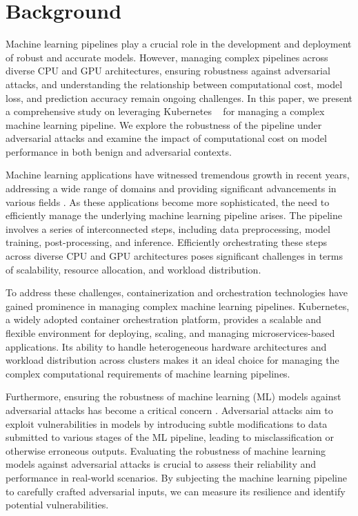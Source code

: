 \documentclass[conference]{IEEEtran}
\begin{document}
\section{Background}
Machine learning pipelines play a crucial role in the development and deployment of robust and accurate models. However, managing complex pipelines across diverse CPU and GPU architectures, ensuring robustness against adversarial attacks, and understanding the relationship between computational cost, model loss, and prediction accuracy remain ongoing challenges. In this paper, we present a comprehensive study on leveraging Kubernetes ~\cite{k8s} for managing a complex machine learning pipeline. We explore the robustness of the pipeline under adversarial attacks and examine the impact of computational cost on model performance in both benign and adversarial contexts.

Machine learning applications have witnessed tremendous growth in recent years, addressing a wide range of domains and providing significant advancements in various fields \cite{li_general_2016, croce_reliable_2020, athalye_obfuscated_2018}. As these applications become more sophisticated, the need to efficiently manage the underlying machine learning pipeline arises. The pipeline involves a series of interconnected steps, including data preprocessing, model training, post-processing, and inference. Efficiently orchestrating these steps across diverse CPU and GPU architectures poses significant challenges in terms of scalability, resource allocation, and workload distribution.

To address these challenges, containerization and orchestration technologies have gained prominence in managing complex machine learning pipelines. Kubernetes, a widely adopted container orchestration platform, provides a scalable and flexible environment for deploying, scaling, and managing microservices-based applications. Its ability to handle heterogeneous hardware architectures and workload distribution across clusters makes it an ideal choice for managing the complex computational requirements of machine learning pipelines.

Furthermore, ensuring the robustness of machine learning (ML) models against adversarial attacks has become a critical concern \cite{adversarialpatch, carlini_towards_2017, croce_reliable_2020, hopskipjump, chakraborty2018adversarial, art2018}. Adversarial attacks aim to exploit vulnerabilities in models by introducing subtle modifications to data submitted to various stages of the ML pipeline, leading to misclassification or otherwise erroneous outputs. Evaluating the robustness of machine learning models against adversarial attacks is crucial to assess their reliability and performance in real-world scenarios. By subjecting the machine learning pipeline to carefully crafted adversarial inputs, we can measure its resilience and identify potential vulnerabilities.
\end{document}
